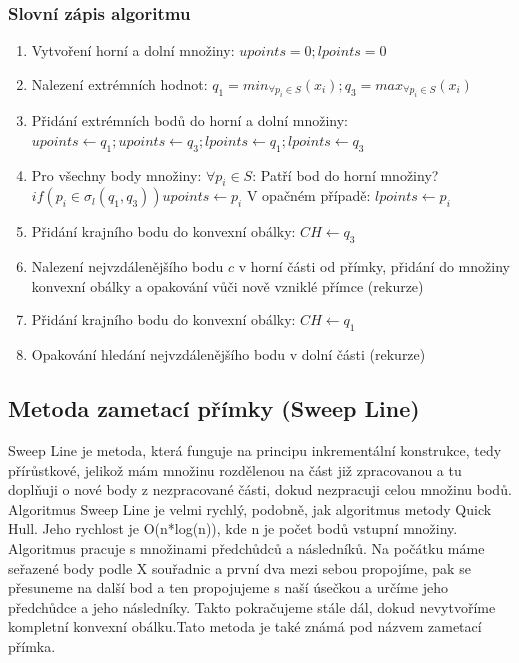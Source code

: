 \documentclass[a4paper,11pt,twoside]{article}
\begin{document}
\subsubsection{Slovní zápis algoritmu}
\begin{enumerate}
\item Vytvoření horní a dolní množiny:  $upoints = 0; lpoints = 0 $ 
\item Nalezení extrémních hodnot:  $ q_1 =  min_{\forall p_i \in S}(x_i); q_3 =  max_{\forall p_i \in S}(x_i) $ 
\item Přidání extrémních bodů do horní a dolní množiny: $upoints \leftarrow q_1; upoints \leftarrow q_3; lpoints \leftarrow q_1; lpoints \leftarrow q_3 $
\item Pro všechny body množiny: $\forall p_i \in S  $:
\subitem Patří bod do horní množiny? $ if(p_i \in \sigma_l(q_1, q_3)) upoints \leftarrow p_i  $
\subitem V opačném případě: $ lpoints \leftarrow p_i  $
\item Přidání krajního bodu do konvexní obálky: $CH \leftarrow q_3$
\item Nalezení nejvzdálenějšího bodu $c$ v horní části od přímky, přidání do množiny konvexní obálky a opakování vůči nově vzniklé přímce (rekurze)
\item Přidání krajního bodu do konvexní obálky: $CH \leftarrow q_1$
\item Opakování hledání nejvzdálenějšího bodu v dolní části (rekurze)
\end{enumerate}


\newpage
\vspace*{-1cm}
\subsection{Metoda zametací přímky (Sweep Line)}
Sweep Line je metoda, která funguje na principu inkrementální konstrukce, tedy přírůstkové, jelikož mám množinu rozdělenou na část již zpracovanou a tu doplňuji o nové body z nezpracované části, dokud nezpracuji celou množinu bodů. Algoritmus Sweep Line je velmi rychlý, podobně, jak algoritmus metody Quick Hull. Jeho rychlost je O(n*log(n)), kde n je počet bodů vstupní množiny. \\
\indent Algoritmus pracuje s množinami předchůdců a následníků. Na počátku máme seřazené body podle X souřadnic a první dva mezi sebou propojíme, pak se přesuneme na další bod a ten propojujeme s naší úsečkou a určíme jeho předchůdce a jeho následníky. Takto pokračujeme stále dál, dokud nevytvoříme kompletní konvexní obálku.Tato metoda je také známá pod názvem zametací přímka.
\end{document}
